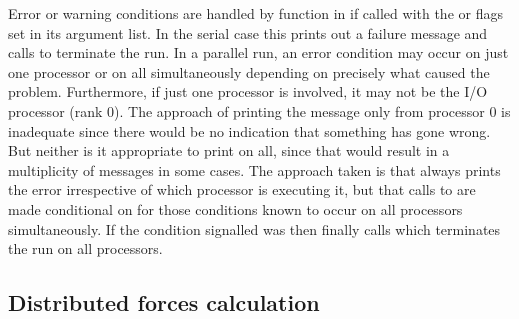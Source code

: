 \documentclass[a4paper,twoside]{report}
\begin{document}
Error or warning conditions are handled by function 
in  if called with the  or 
flags set in its argument list.  In the serial case this prints out a
failure message and calls  to terminate the run.  In a
parallel run, an error condition may occur on just one processor or on
all simultaneously depending on precisely what caused the problem.
Furthermore, if just one processor is involved, it may not be the I/O
processor (rank 0).  The approach of printing the message only from
processor 0 is inadequate since there would be no indication that
something has gone wrong.  But neither is it appropriate to print on
all, since that would result in a multiplicity of messages in some
cases.  The approach taken is that  always prints
the error irrespective of which processor is executing it, but that
calls to  are made conditional on
 for those conditions known to occur on all
processors simultaneously. If the condition signalled was
 then  finally calls 
which terminates the run on all processors.

\subsection{Distributed forces calculation}
\end{document}
